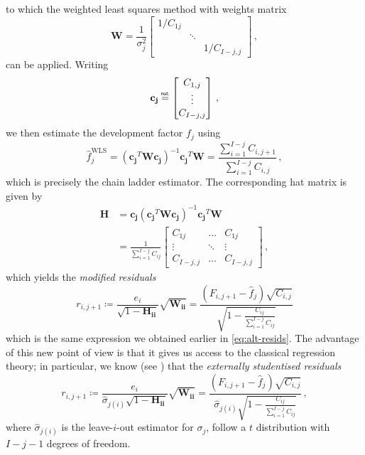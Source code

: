 \documentclass[a4paper]{book}
\theoremstyle{plain}
\newcommand\notation{\mathrel{\overset{\makebox[0pt]{\mbox{\normalfont\tiny\sffamily not.}}}{=}}}
\begin{document}
to which the weighted least squares method with weights matrix
\begin{equation}
  \mathbf{W} = \frac{1}{\sigma^2_j}
  \begin{bmatrix}
    1 / C_{1j} & & \\
    & \ddots & \\
    & & 1 / C_{I - j, j}
  \end{bmatrix} \,,
\end{equation}
can be applied. Writing
\begin{equation}
  \mathbf{c_j} \notation
  \begin{bmatrix}
    C_{1, j} \\
    \vdots \\
    C_{I - j, j}
  \end{bmatrix} \,,
\end{equation}
we then estimate the development factor $f_j$ using
\begin{equation}
  \hat{f}^{\mathrm{WLS}}_j = (\mathbf{c_j}^T \mathbf{W} \mathbf{c_j})^{-1} \mathbf{c_j}^T \mathbf{W} = \frac{\sum_{i=1}^{I - j} C_{i, j + 1}}{\sum_{i=1}^{I - j} C_{i, j}} \,,
\end{equation}
which is precisely the chain ladder estimator. The corresponding hat matrix is given by
\begin{align}
  \mathbf{H} &= \mathbf{c_j} (\mathbf{c_j}^T \mathbf{W} \mathbf{c_j})^{-1} \mathbf{c_j}^T \mathbf{W} \\[4pt]
  &= \frac{1}{\sum_{i = 1}^{I - j} C_{ij}}
  \begin{bmatrix}
    C_{1j} & \dots & C_{1j} \\
    \vdots & \ddots & \vdots\\
    C_{I - j, j} & \dots & C_{I - j, j}
  \end{bmatrix} \,,
\end{align}
which yields the \emph{modified residuals}
\begin{equation}
  r_{i, j + 1} \coloneqq \frac{e_i}{\sqrt{1 - \mathbf{H_{ii}}}} \sqrt{\mathbf{W_{ii}}} = \frac{(F_{i, j + 1} - \hat{f}_j)\sqrt{C_{i, j}}}{\sqrt{1 - \frac{C_{ij}}{\sum_{i=1}^{I - j} C_{ij}}}}
\end{equation}
which is the same expression we obtained earlier in \cref{eq:alt-resids}. The advantage of this new point of view is that it gives us access to the classical regression theory; in particular, we know (see \cite[267 \psqq]{seber}) that the \emph{externally studentised residuals}
\begin{equation}
  r_{i, j + 1} \coloneqq \frac{e_i}{\hat{\sigma}_{j (i)} \sqrt{1 - \mathbf{H_{ii}}}} \sqrt{\mathbf{W_{ii}}} = \frac{(F_{i, j + 1} - \hat{f}_j)\sqrt{C_{i, j}}}{\hat{\sigma}_{j (i)} \sqrt{1 - \frac{C_{ij}}{\sum_{i=1}^{I - j} C_{ij}}}} \,,
\end{equation}
where $\hat{\sigma}_{j (i)}$ is the leave-$i$-out estimator for $\sigma_j$, follow a $t$ distribution with $I - j - 1$ degrees of freedom.
\end{document}
